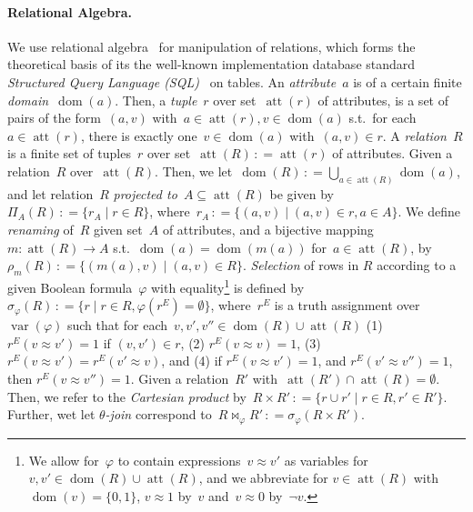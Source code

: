 \documentclass{llncs}
\newcommand{\eqdef}{\ensuremath{\,\mathrel{\mathop:}=}}
\DeclareMathOperator{\dom}{dom}
\DeclareMathOperator{\attr}{att}
\DeclareMathOperator{\var}{var}
\begin{document}
\paragraph*{Relational Algebra.}%
We use relational algebra~\cite{Codd70} for manipulation of relations,
which forms the theoretical basis of its the well-known implementation database standard 
\emph{Structured Query Language (SQL)}~\cite{} on tables.
An \emph{attribute}~$a$ is of a certain finite \emph{domain~$\dom(a)$}.
Then, a \emph{tuple}~$r$ over set~$\attr(r)$ of attributes,
is a set of pairs of the form~$(a, v)$ with~$a\in\attr(r),v\in \dom(a)$ s.t.\ for each~$a\in \attr(r)$, there is exactly one~$v\in\dom(a)$ with~$(a,v)\in r$.
A \emph{relation~$R$} is a finite set of tuples~$r$ over set~$\attr(R)\eqdef\attr(r)$ of attributes.
Given a relation~$R$ over~$\attr(R)$.
Then, we let~$\dom(R)\eqdef \bigcup_{a\in \attr(R)}\dom(a)$, and let relation~$R$ \emph{projected to~$A\subseteq \attr(R)$} be given by $\Pi_{A}(R)\eqdef \{r_A \mid r\in R\}$, where~$r_A \eqdef \{(a, v) \mid (a, v) \in r, a \in A\}$.
We define \emph{renaming} of~$R$ given set~$A$ of attributes, and a bijective mapping~$m:\attr(R) \rightarrow A$ s.t.\ $\dom(a)=\dom(m(a))$ for~$a\in\attr(R)$, by~$\rho_m(R) \eqdef \{(m(a),v) \mid (a,v)\in R\}$.
\emph{Selection} of rows in $R$ according to a given Boolean formula~$\varphi$ with equality\footnote{We allow for~$\varphi$ to contain expressions~$v{\approx}v'$ as variables for $v,v'\in\dom(R)\cup\attr(R)$, and we abbreviate for $v\in\attr(R)$ with~$\dom(v)=\{0,1\}$, $v{\approx}1$ by~$v$ and~$v{\approx}0$ by~$\neg v$.} is defined by~$\sigma_{\varphi}(R)\eqdef \{ r \mid r\in R, \varphi(r^E)=\emptyset \}$, where~$r^{E}$ is a truth assignment over~$\var(\varphi)$ such that for each~$v,v',v''\in\dom(R)\cup\attr(R)$ (1) $r^E(v{\approx}v')=1$ if $(v, v')\in r$, (2) $r^E(v{\approx}v)=1$, (3) $r^E(v{\approx}v')=r^E(v'{\approx}v)$, and (4) if $r^E(v{\approx}v')=1$, and $r^E(v'{\approx}v'')=1$, then $r^E(v{\approx}v'')=1$.
Given a relation~$R'$ with~$\attr(R')\cap\attr(R)=\emptyset$. Then, we refer to the \emph{Cartesian product} by~$R\times R'\eqdef \{ r\cup r' \mid r\in R, r'\in R'\}$.
Further, wet let \emph{$\theta$-join} correspond to~$R \bowtie_\varphi R' \eqdef \sigma_\varphi(R\times R')$.
\end{document}
